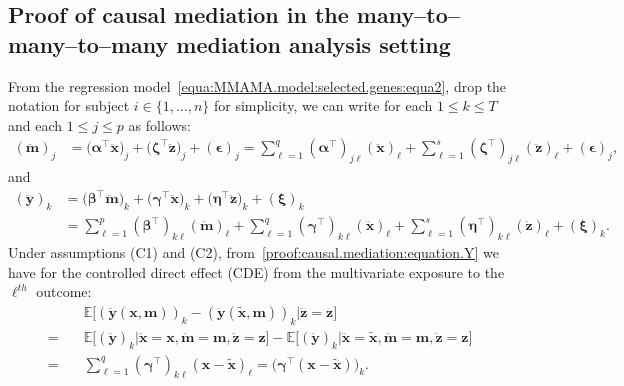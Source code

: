 \documentclass[
  12pt]{article}
\def\E{\mathbb{E}}
\begin{document}
\subsection{Proof of causal mediation in the many--to--many--to--many mediation analysis setting}
\label{sec:proof:causal.mediation}
From the regression model~\eqref{equa:MMAMA.model:selected.genes:equa2}, drop the notation for subject $i \in \{1,...,n\}$ for simplicity, we can write for each $1 \leq k \leq T$ and each $1 \leq j \leq p$ as follows: 
\begin{align}
	(\ddot{\mathbf{m}})_{j} &= \big( \bm{\alpha}^{\top} \ddot{\mathbf{x}} \big)_{j}  +  \big( \bm{\zeta}^{\top} \ddot{\mathbf{z}} \big)_{j}  +  (\bm{\epsilon})_{j} 
	= \sum_{\ell=1}^{q} (\bm{\alpha}^{\top} )_{j  \ell} (\ddot{\mathbf{x}})_{\ell}  +  \sum_{\ell=1}^{s} ( \bm{\zeta}^{\top} )_{j \ell} (\ddot{\mathbf{z}})_{\ell}  +  (\bm{\epsilon})_{j}  , 
	\label{proof:causal.mediation:equation.M}
\end{align}
and 
\begin{align}
	(\ddot{\mathbf{y}})_{k} &= \big( \bm{\beta}^{\top} \ddot{\mathbf{m}} \big)_{k}  + \big( \bm{\gamma}^{\top} \ddot{\mathbf{x}} \big)_{k}  +  \big( \bm{\eta}^{\top} \ddot{\mathbf{z}} \big)_{k}  +  (\bm{\xi})_{k} 
	\label{proof:causal.mediation:equation.Y}
	\\
	&= \sum_{\ell=1}^{p} ( \bm{\beta}^{\top} )_{k \ell} (\ddot{\mathbf{m}})_{\ell}  +  \sum_{\ell=1}^{q} ( \bm{\gamma}^{\top})_{k \ell} (\ddot{\mathbf{x}})_{\ell}  +  \sum_{\ell=1}^{s} ( \bm{\eta}^{\top})_{k \ell} (\ddot{\mathbf{z}})_\ell  +  (\bm{\xi})_{k}  .
	\nonumber  
\end{align}
Under assumptions (C1) and (C2), from~\eqref{proof:causal.mediation:equation.Y} we have for the controlled direct effect (CDE) from the multivariate exposure to the $\ell^{th}$ outcome:  
\begin{align*}
& \E \big[ (\ddot{\mathbf{y}}(\mathbf{x},\mathbf{m}))_{k} - (\ddot{\mathbf{y}}(\widetilde{\mathbf{x}},\mathbf{m}))_{k}  \big| \ddot{\mathbf{z}} = \mathbf{z} \big] 
\\
= \quad & \E \big[ (\ddot{\mathbf{y}})_{k} \big| \ddot{\mathbf{x}} = \mathbf{x}, \ddot{\mathbf{m}} = \mathbf{m}, \ddot{\mathbf{z}} = \mathbf{z} \big]  - \E \big[ (\ddot{\mathbf{y}})_{k} \big| \ddot{\mathbf{x}} = \widetilde{\mathbf{x}}, \ddot{\mathbf{m}} = \mathbf{m}, \ddot{\mathbf{z}} = \mathbf{z} \big]
\\
= \quad &  \sum_{\ell=1}^{q} ( \bm{\gamma}^{\top})_{k \ell} (\mathbf{x} - \widetilde{\mathbf{x}})_{\ell} = \big( \bm{\gamma}^{\top} (\mathbf{x} - \widetilde{\mathbf{x}}) \big)_{k}. 
\end{align*}
\end{document}
